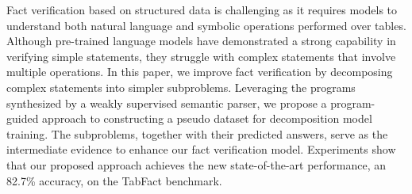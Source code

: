 Fact verification based on structured data is challenging as it requires models to understand both natural language and symbolic operations performed over tables. Although pre-trained language models have demonstrated a strong capability in verifying simple statements, they struggle with complex statements that involve multiple operations. In this paper, we improve fact verification by decomposing complex statements into simpler subproblems. Leveraging the programs synthesized by a weakly supervised semantic parser, we propose a program-guided approach to constructing a pseudo dataset for decomposition model training. The subproblems, together with their predicted answers, serve as the intermediate evidence to enhance our fact verification model. Experiments show that our proposed approach achieves the new state-of-the-art performance, an 82.7\% accuracy, on the TabFact benchmark.
